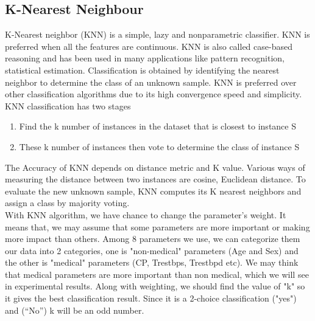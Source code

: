 \documentclass[oneside,12pt]{Classes/VTU}
\begin{document}
    		\subsection{K-Nearest Neighbour}  
    		K-Nearest neighbor (KNN) is a simple, lazy and nonparametric classifier. KNN is preferred when all the features are continuous. KNN is also called case-based reasoning and has been used in many applications like pattern recognition, statistical estimation. Classification is obtained by identifying the nearest neighbor to determine the class of an unknown sample. KNN is preferred over other classification algorithms due to its high convergence speed and simplicity.\\
    		KNN classification has two stages
    		\begin{enumerate}
    			\item Find the k number of instances in the dataset that is closest to instance S
    			\item These k number of instances then vote to determine the class of instance S
    		\end{enumerate}
    		The Accuracy of KNN depends on distance metric and K value. Various ways of measuring the distance between two instances are cosine, Euclidean distance. To evaluate the new unknown sample, KNN computes its K nearest neighbors and assign a class by majority voting.\\    		
    		With KNN algorithm, we have chance to change the parameter's weight. It means that, we may assume that some parameters are more important or making more impact than others. Among 8 parameters we use, we can categorize them our data into 2 categories, one is "non-medical" parameters (Age and Sex) and the other is "medical" parameters (CP, Trestbps, Trestbpd etc). We may think that medical parameters are more important than non medical, which we will see in experimental results. Along with weighting, we should find the value of "k" so it gives the best classification result. Since it is a 2-choice classification ("yes") and (“No”) k will be an odd number.
    		
\end{document}
